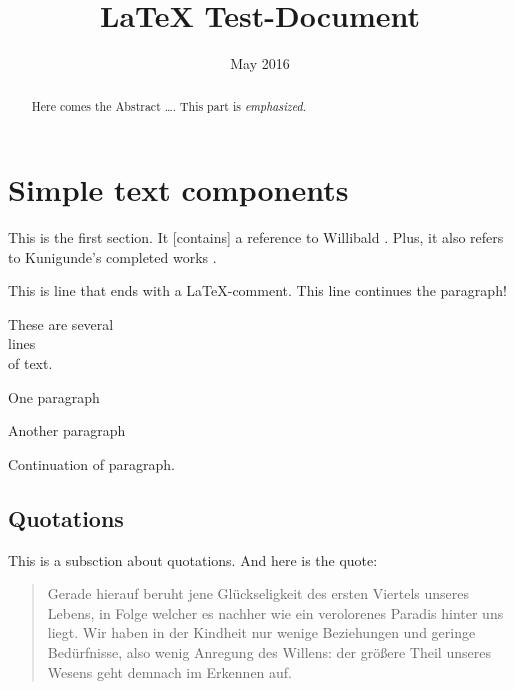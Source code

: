 \documentclass[12pt, english, a4paper]{article}
\begin{document}
\title{LaTeX Test-Document}

\date{May 2016}
 
\maketitle

\begin{abstract}
Here comes the Abstract \ldots. This part is {\em emphasized}.
\end{abstract}

\newpage

\tableofcontents

\section{Simple text components}

This is the first section. It [contains] a reference to
Willibald \citet[32]{Willibald2015}. Plus, it also refers to
Kunigunde's completed works \citep{Kunigunde2010}.

This is line that ends with a LaTeX-comment. %
This line continues the paragraph!

These are several \\
lines \\
of text.

One paragraph

Another paragraph


Continuation of paragraph.

\subsection{Quotations}

This is a subsction about quotations. And here is the quote:

\begin{quote}
    Gerade hierauf beruht jene Glückseligkeit des ersten Viertels unseres Lebens,
    in Folge welcher es nachher wie ein verolorenes Paradis hinter uns liegt.
    Wir haben in der Kindheit nur wenige Beziehungen und geringe Bedürfnisse, also wenig
    Anregung des Willens: der größere Theil unseres Wesens geht demnach im Erkennen auf.
    \cite[199]{Schopenhauer1851}
\end{quote}
\end{document}
